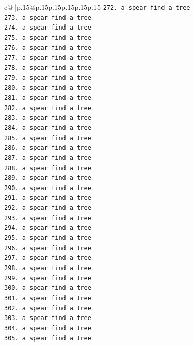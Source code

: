 \documentclass{article}
\begin{document}
{\begin{supertabular}{c@{$\;$}|p{.15\linewidth}@{}p{.15\linewidth}p{.15\linewidth}p{.15\linewidth}p{.15\linewidth}p{.15\linewidth}}
{{{\texttt{272. a spear find a tree} \\
\texttt{273. a spear find a tree} \\
\texttt{274. a spear find a tree} \\
\texttt{275. a spear find a tree} \\
\texttt{276. a spear find a tree} \\
\texttt{277. a spear find a tree} \\
\texttt{278. a spear find a tree} \\
\texttt{279. a spear find a tree} \\
\texttt{280. a spear find a tree} \\
\texttt{281. a spear find a tree} \\
\texttt{282. a spear find a tree} \\
\texttt{283. a spear find a tree} \\
\texttt{284. a spear find a tree} \\
\texttt{285. a spear find a tree} \\
\texttt{286. a spear find a tree} \\
\texttt{287. a spear find a tree} \\
\texttt{288. a spear find a tree} \\
\texttt{289. a spear find a tree} \\
\texttt{290. a spear find a tree} \\
\texttt{291. a spear find a tree} \\
\texttt{292. a spear find a tree} \\
\texttt{293. a spear find a tree} \\
\texttt{294. a spear find a tree} \\
\texttt{295. a spear find a tree} \\
\texttt{296. a spear find a tree} \\
\texttt{297. a spear find a tree} \\
\texttt{298. a spear find a tree} \\
\texttt{299. a spear find a tree} \\
\texttt{300. a spear find a tree} \\
\texttt{301. a spear find a tree} \\
\texttt{302. a spear find a tree} \\
\texttt{303. a spear find a tree} \\
\texttt{304. a spear find a tree} \\
\texttt{305. a spear find a tree} \\
}}}
\end{supertabular}}
\end{document}

